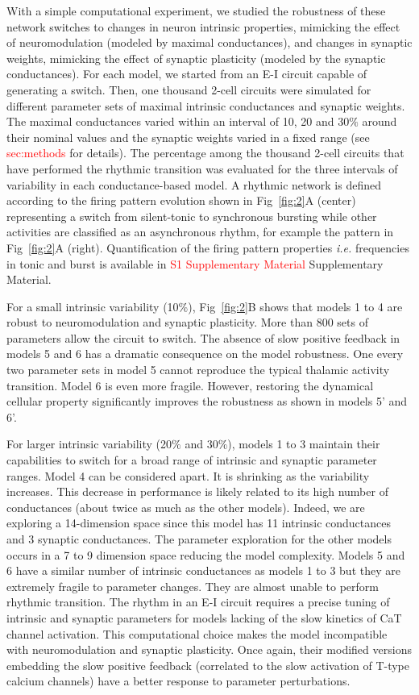 With a simple computational experiment, we studied the robustness of these network switches to changes in neuron intrinsic properties, mimicking the effect of neuromodulation (modeled by maximal conductances), and changes in synaptic weights, mimicking the effect of synaptic plasticity (modeled by the synaptic conductances). For each model, we started from an E-I circuit capable of generating a switch. Then, one thousand 2-cell circuits were simulated for different parameter sets of maximal intrinsic conductances and synaptic weights. The  maximal conductances varied within an interval of  10, 20 and 30$\%$ around their nominal values and the synaptic weights varied in a fixed range (see \textcolor{red}{sec:methods} for details). The percentage among the thousand 2-cell circuits  that have performed the rhythmic transition was evaluated for the three intervals of variability in each conductance-based model. A rhythmic network  is defined according to the firing pattern evolution shown in Fig~\ref{fig:2}A (center) representing a switch from silent-tonic to synchronous bursting while other activities are classified as an asynchronous rhythm, for example the pattern in  Fig~\ref{fig:2}A (right). Quantification of the firing pattern properties \textit{i.e.} frequencies in tonic and burst is available in \textcolor{red}{S1 Supplementary Material} Supplementary Material.

For a small intrinsic variability (10$\%$), Fig~\ref{fig:2}B shows that models 1 to 4 are robust to neuromodulation and synaptic plasticity. More than 800 sets of parameters allow the circuit to switch. The absence of slow positive feedback in models 5 and 6 has a dramatic consequence on the model robustness. One every two parameter sets in model 5 cannot reproduce the typical thalamic activity transition. Model 6 is even more fragile. However, restoring the dynamical cellular property significantly improves the robustness as shown in models 5' and 6'. 

For larger intrinsic variability (20$\%$ and 30$\%$), models 1 to 3 maintain their capabilities to switch for a broad range of intrinsic and synaptic parameter ranges. Model 4 can be considered apart. It is shrinking as the variability increases. This decrease in performance is likely related to its high number of conductances (about twice as much as the other models). Indeed, we are exploring a 14-dimension space since this model has 11 intrinsic conductances and 3 synaptic conductances. The parameter exploration for the other models occurs in a 7 to 9 dimension space reducing the model complexity. Models 5 and 6 have a similar number of intrinsic conductances as models 1 to 3 but they are extremely fragile to parameter changes. They are almost unable to perform rhythmic transition. The rhythm in an E-I circuit requires a precise tuning of intrinsic and synaptic parameters for models lacking of the slow kinetics of CaT channel activation. This computational choice makes the model incompatible with neuromodulation and synaptic plasticity.  Once again, their modified versions embedding the slow positive feedback (correlated to the slow activation of T-type calcium channels) have a better response to parameter perturbations. 


